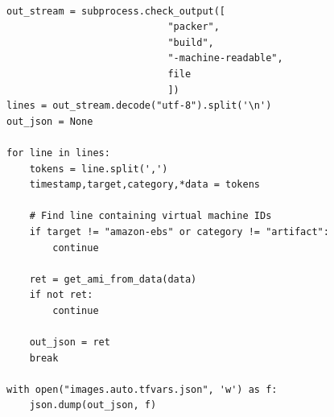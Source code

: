 \documentclass{l4proj}
\begin{document}
\begin{lstlisting}[caption={A demonstration of extracting produced virtual machine image IDs from packer, subsequently producing a data file amenable for use within Terraform.}]

out_stream = subprocess.check_output([
                            "packer",
                            "build",
                            "-machine-readable",
                            file
                            ])
lines = out_stream.decode("utf-8").split('\n')
out_json = None

for line in lines:
    tokens = line.split(',')
    timestamp,target,category,*data = tokens
    
    # Find line containing virtual machine IDs
    if target != "amazon-ebs" or category != "artifact":
        continue
    
    ret = get_ami_from_data(data)
    if not ret:
        continue

    out_json = ret
    break

with open("images.auto.tfvars.json", 'w') as f:
    json.dump(out_json, f)

\end{lstlisting}
\end{document}
